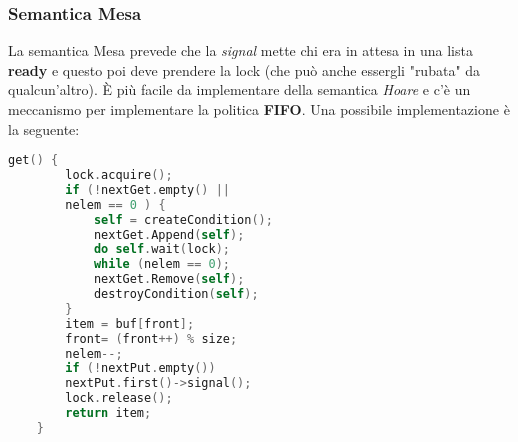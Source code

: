 \subsubsection{Semantica Mesa}
La semantica Mesa prevede che la \textit{signal} mette chi era in attesa in una lista \textbf{ready} e questo poi deve prendere la lock (che può anche essergli "rubata" da qualcun'altro). È più facile da implementare della semantica \textit{Hoare} e c'è un meccanismo per implementare la politica \textbf{FIFO}. Una possibile implementazione è la seguente:
\begin{lstlisting}[language=C]
	get() {
		lock.acquire();
		if (!nextGet.empty() ||
		nelem == 0 ) {
			self = createCondition();
			nextGet.Append(self);
			do self.wait(lock);
			while (nelem == 0);
			nextGet.Remove(self);
			destroyCondition(self);
		}
		item = buf[front];
		front= (front++) % size;
		nelem--;
		if (!nextPut.empty())
		nextPut.first()->signal();
		lock.release();
		return item;
	}
\end{lstlisting}